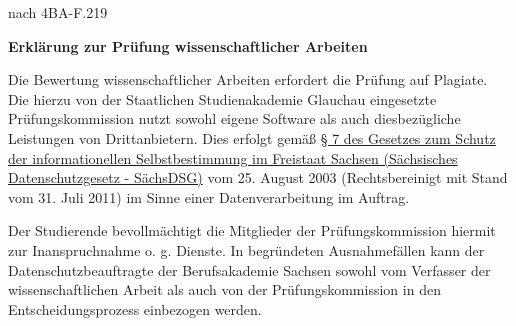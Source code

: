 \newpage

  \rohead{}
      \vspace*{2mm}

      \begin{minipage}{0.5\columnwidth}
          
      \end{minipage}
      \begin{minipage}{0.45\columnwidth}
          \begin{flushright}
              {\small nach 4BA-F.219\\}
          \end{flushright}
      \end{minipage}
      \vspace*{2mm}

      \begin{center}
          \textbf{\huge{Erklärung zur Prüfung wissenschaftlicher Arbeiten}}
      \end{center}

      Die Bewertung wissenschaftlicher Arbeiten erfordert die Prüfung auf Plagiate. Die hierzu von der Staatlichen Studienakademie Glauchau eingesetzte Prüfungskommission nutzt sowohl eigene Software als auch diesbezügliche Leistungen von Drittanbietern. Dies erfolgt gemäß \href{https://www.revosax.sachsen.de/vorschrift/1672-Saechsisches-Datenschutzgesetz#p7}{§ 7 des Gesetzes zum Schutz der informationellen Selbstbestimmung im Freistaat Sachsen (Sächsisches Datenschutzgesetz - SächsDSG)} vom 25. August 2003 (Rechtsbereinigt mit Stand vom 31. Juli 2011) im Sinne einer Datenverarbeitung im Auftrag.

      Der Studierende bevollmächtigt die Mitglieder der Prüfungskommission hiermit zur Inanspruchnahme o. g. Dienste. In begründeten Ausnahmefällen kann der Datenschutzbeauftragte der Berufsakademie Sachsen sowohl vom Verfasser der wissenschaftlichen Arbeit als auch von der Prüfungskommission in den Entscheidungsprozess einbezogen werden.

